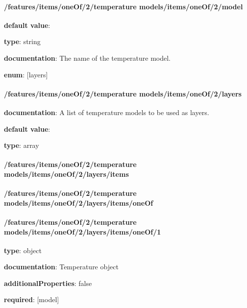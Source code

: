\paragraph{/features/items/oneOf/2/temperature models/items/oneOf/2/model} \begin{itemized}
\item {\bf default value}: 
\item {\bf type}: string
\item {\bf documentation}: The name of the temperature model.
\item {\bf enum}: [layers]\end{itemized}\paragraph{/features/items/oneOf/2/temperature models/items/oneOf/2/layers} \begin{itemized}
\item {\bf documentation}: A list of temperature models to be used as layers.
\item {\bf default value}: 
\item {\bf type}: array
\paragraph{/features/items/oneOf/2/temperature models/items/oneOf/2/layers/items} \begin{itemized}
\end{itemized}\end{itemized}\paragraph{/features/items/oneOf/2/temperature models/items/oneOf/2/layers/items/oneOf} \begin{itemized}
\end{itemized}\paragraph{/features/items/oneOf/2/temperature models/items/oneOf/2/layers/items/oneOf/1} \begin{itemized}
\item {\bf type}: object
\item {\bf documentation}: Temperature object
\item {\bf additionalProperties}: false
\item {\bf required}: [model]\end{itemized}
